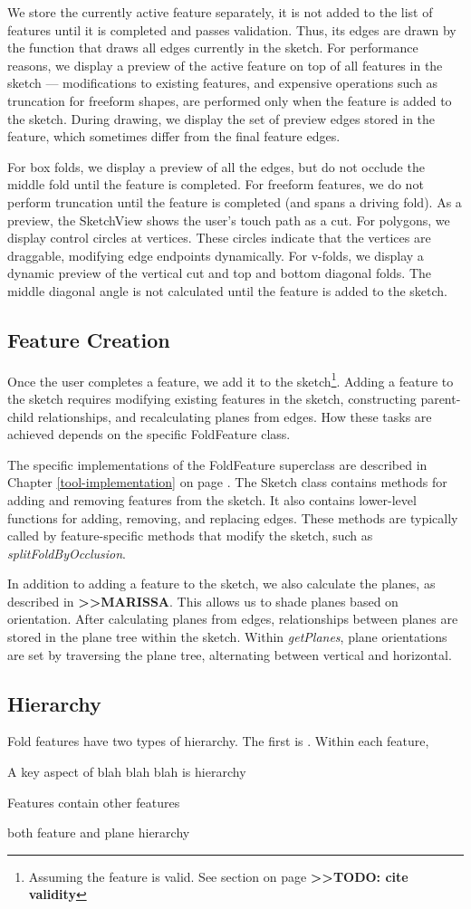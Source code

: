 We store the currently active feature separately, it is not added to the
list of features until it is completed and passes validation. Thus, its
edges are drawn by the function that draws all edges currently in the
sketch. For performance reasons, we display a preview of the active
feature on top of all features in the sketch --- modifications to
existing features, and expensive operations such as truncation for
freeform shapes, are performed only when the feature is added to the
sketch. During drawing, we display the set of preview edges stored in
the feature, which sometimes differ from the final feature edges.

For box folds, we display a preview of all the edges, but do not occlude
the middle fold until the feature is completed. For freeform features,
we do not perform truncation until the feature is completed (and spans a
driving fold). As a preview, the SketchView shows the user's touch path
as a cut. For polygons, we display control circles at vertices. These
circles indicate that the vertices are draggable, modifying edge
endpoints dynamically. For v-folds, we display a dynamic preview of the
vertical cut and top and bottom diagonal folds. The middle diagonal
angle is not calculated until the feature is added to the sketch.

\subsection{Feature Creation}\label{feature-creation}

Once the user completes a feature, we add it to the sketch\footnote{Assuming
  the feature is valid. See section on page
  \textbf{\textgreater{}\textgreater{}TODO: cite validity}}. Adding a
feature to the sketch requires modifying existing features in the
sketch, constructing parent-child relationships, and recalculating
planes from edges. How these tasks are achieved depends on the specific
FoldFeature class.

The specific implementations of the FoldFeature superclass are described
in Chapter \ref{tool-implementation} on page
\pageref{tool-implementation}. The Sketch class contains methods for
adding and removing features from the sketch. It also contains
lower-level functions for adding, removing, and replacing edges. These
methods are typically called by feature-specific methods that modify the
sketch, such as \emph{splitFoldByOcclusion}.

In addition to adding a feature to the sketch, we also calculate the
planes, as described in \textbf{\textgreater{}\textgreater{}MARISSA}.
This allows us to shade planes based on orientation. After calculating
planes from edges, relationships between planes are stored in the plane
tree within the sketch. Within \emph{getPlanes}, plane orientations are
set by traversing the plane tree, alternating between vertical and
horizontal.

\subsection{Hierarchy}\label{hierarchy}

Fold features have two types of hierarchy. The first is . Within each
feature,

A key aspect of blah blah blah is hierarchy

Features contain other features

both feature and plane hierarchy
